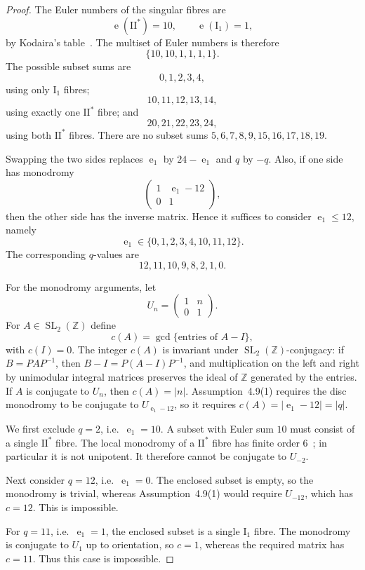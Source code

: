 \documentclass[12pt]{article}
\theoremstyle{plain}
\theoremstyle{definition}
\DeclareMathOperator{\SL}{SL}
\DeclareMathOperator{\eul}{e}
\newcommand{\bZ}{\mathbb{Z}}
\begin{document}
\begin{proof}
The Euler numbers of the singular fibres are
\[
\eul(\mathrm{II}^*)=10,\qquad \eul(\mathrm{I}_1)=1,
\]
by Kodaira's table~\cite{Kod63}.  The multiset of Euler numbers is therefore
\[
\{10,10,1,1,1,1\}.
\]
The possible subset sums are
\[
0,1,2,3,4,
\]
using only $\mathrm{I}_1$ fibres;
\[
10,11,12,13,14,
\]
using exactly one $\mathrm{II}^*$ fibre; and
\[
20,21,22,23,24,
\]
using both $\mathrm{II}^*$ fibres.  There are no subset sums $5,6,7,8,9,15,16,17,18,19$.

Swapping the two sides replaces $\eul_1$ by $24-\eul_1$ and $q$ by $-q$.  Also, if one side has monodromy
\[
\begin{pmatrix}
1 & \eul_1-12\\
0 & 1
\end{pmatrix},
\]
then the other side has the inverse matrix.  Hence it suffices to consider $\eul_1\le 12$, namely
\[
\eul_1\in\{0,1,2,3,4,10,11,12\}.
\]
The corresponding $q$-values are
\[
12,11,10,9,8,2,1,0.
\]

For the monodromy arguments, let
\[
U_n=
\begin{pmatrix}
1 & n\\
0 & 1
\end{pmatrix}.
\]
For $A\in \SL_2(\bZ)$ define
\[
c(A)=\gcd\{\text{entries of }A-I\},
\]
with $c(I)=0$.  The integer $c(A)$ is invariant under $\SL_2(\bZ)$-conjugacy: if $B=PAP^{-1}$, then $B-I=P(A-I)P^{-1}$, and multiplication on the left and right by unimodular integral matrices preserves the ideal of $\bZ$ generated by the entries.  If $A$ is conjugate to $U_n$, then $c(A)=|n|$.  Assumption~4.9(1) requires the disc monodromy to be conjugate to $U_{\eul_1-12}$, so it requires $c(A)=|\eul_1-12|=|q|$.

We first exclude $q=2$, i.e.\ $\eul_1=10$.  A subset with Euler sum $10$ must consist of a single $\mathrm{II}^*$ fibre.  The local monodromy of a $\mathrm{II}^*$ fibre has finite order $6$~\cite{Kod63}; in particular it is not unipotent.  It therefore cannot be conjugate to $U_{-2}$.

Next consider $q=12$, i.e.\ $\eul_1=0$.  The enclosed subset is empty, so the monodromy is trivial, whereas Assumption~4.9(1) would require $U_{-12}$, which has $c=12$.  This is impossible.

For $q=11$, i.e.\ $\eul_1=1$, the enclosed subset is a single $\mathrm{I}_1$ fibre.  The monodromy is conjugate to $U_1$ up to orientation, so $c=1$, whereas the required matrix has $c=11$.  Thus this case is impossible.


\end{proof}
\end{document}
